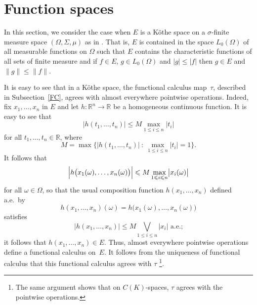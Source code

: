 \documentclass[12pt]{amsart}
\theoremstyle{plain}
\theoremstyle{definition}
\newcommand{\abs}[1]{\lvert#1\rvert}
\newcommand{\norm}[1]{\lVert#1\rVert}
\newcommand{\bigabs}[1]{\bigl\lvert#1\bigr\rvert}
\newcommand{\Bigabs}[1]{\Bigl\lvert#1\Bigr\rvert}
\renewcommand{\le}{\leqslant}
\renewcommand{\mid}{\::\:}
\newcommand{\marg}[1]{\marginpar{\tiny #1}}
\def\xyroot{x^{\frac{1}{2}}{y^{\frac{1}{2}}}}
\begin{document}



\section{Function spaces}\label{functions}

In this section, we consider the case when $E$ is a K\"othe space on a
$\sigma$-finite measure space $(\Omega,\Sigma,\mu)$ as in
\cite[Definition~1.b.17]{Lindenstrauss:79}. That is, $E$ is contained
in the space $L_0(\Omega)$ of all measurable functions on $\Omega$
such that $E$ contains the characteristic functions of all sets of
finite measure and if $f\in E$, $g\in L_0(\Omega)$ and
$\abs{g}\le\abs{f}$ then $g\in E$ and $\norm{g}\le\norm{f}$.

It is easy to see that in a K\"othe space, the functional calculus
map~$\tau$, described in Subsection~\ref{FC}, agrees with almost
everywhere pointwise operations. Indeed, fix $x_1,\dots,x_n$ in $E$
and let $h\colon\mathbb R^n\to\mathbb R$ be a homogeneous continuous
function. It is easy to see that
\begin{displaymath}
  \bigabs{h(t_1,\dots,t_n)}\le M\max\limits_{1\le i\le n}\abs{t_i}
\end{displaymath}
for all $t_1,\dots,t_n\in\mathbb R$, where
\begin{displaymath}
  M=\max\bigl\{\abs{h(t_1,\dots,t_n)}\mid
  \max\limits_{1\le i\le n}\abs{t_i}=1\bigr\}.
\end{displaymath}
It follows that
\begin{displaymath}
  \Bigabs{h\bigl(x_1(\omega),\dots,x_n(\omega)\bigr)}\le
  M\max\limits_{1\le i\le n}\bigabs{x_i(\omega)}
\end{displaymath}
for all $\omega\in\Omega$, so that the usual composition function
$h(x_1,\dots,x_n)$ defined a.e.\ by 
\begin{displaymath}
  h(x_1,\dots,x_n)(\omega)=h\bigl(x_1(\omega),\dots,x_n(\omega)\bigr)
\end{displaymath}
satisfies
\begin{displaymath}
  \bigabs{h(x_1,\dots,x_n)}\le M\bigvee\limits_{1\le i\le n}\abs{x_i}
  \mbox{ a.e.;}
\end{displaymath}
it follows that $h(x_1,\dots,x_n)\in E$. Thus, almost everywhere
pointwise operations define a functional calculus on~$E$.  It follows
from the uniqueness of functional calculus that this functional
calculus agrees with $\tau$
\footnote{The same argument shows that on $C(K)$-spaces, $\tau$ agrees
  with the pointwise operations.}.
\end{document}
